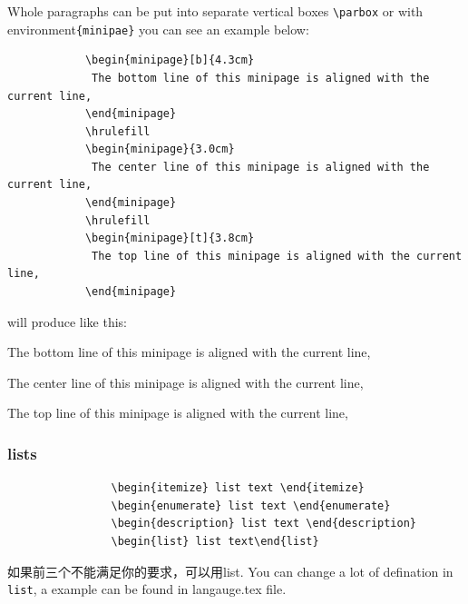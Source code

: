 \documentclass[a4paper,12pt,twoside]{book}
\begin{document}
\begin{CJK*}{UTF8}{song}
			Whole paragraphs can be put into separate vertical boxes \verb=\parbox= or with environment\verb={minipae}= you can see an example below:\par
			
			\begin{verbatim}
			\begin{minipage}[b]{4.3cm}
			 The bottom line of this minipage is aligned with the current line,
			\end{minipage}
			\hrulefill
			\begin{minipage}{3.0cm}
			 The center line of this minipage is aligned with the current line,
			\end{minipage}
			\hrulefill
			\begin{minipage}[t]{3.8cm}
			 The top line of this minipage is aligned with the current line,
			\end{minipage}
			\end{verbatim}
			will produce like this: \par

			\begin{minipage}[b]{4.3cm}
			 The bottom line of this minipage is aligned with the current line,
			\end{minipage}
			\hrulefill
			\begin{minipage}{3.0cm}
			 The center line of this minipage is aligned with the current line,
			\end{minipage}
			\hrulefill
			\begin{minipage}[t]{3.8cm}
			 The top line of this minipage is aligned with the current line,
			\end{minipage}

		\subsubsection{lists}
			\begin{verbatim}
				\begin{itemize} list text \end{itemize}
				\begin{enumerate} list text \end{enumerate}
				\begin{description} list text \end{description}
				\begin{list} list text\end{list}
			\end{verbatim}	
			如果前三个不能满足你的要求，可以用list. You can change a lot of defination in \verb=list=, a example can be found in langauge.tex file.

\end{CJK*}
\end{document}
